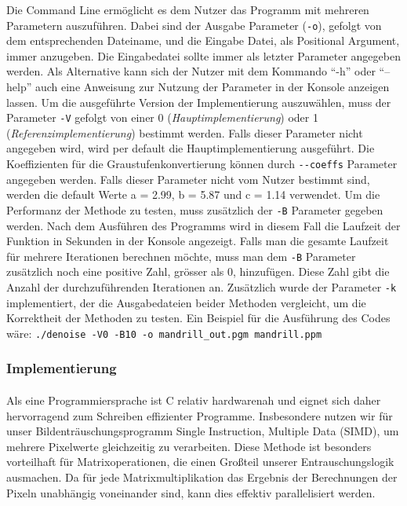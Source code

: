 \documentclass[course=erap]{aspdoc}
\begin{document}
Die Command Line ermöglicht es dem Nutzer das Programm mit mehreren Parametern auszuführen. 
Dabei sind der Ausgabe Parameter (\verb|-o|), gefolgt von dem entsprechenden Dateiname, und die Eingabe Datei, als Positional Argument, immer anzugeben. Die Eingabedatei sollte immer als letzter Parameter angegeben werden.
Als Alternative kann sich der Nutzer mit dem Kommando \enquote{-h} oder \enquote{--help} auch eine Anweisung zur
Nutzung der Parameter in der Konsole anzeigen lassen. Um die ausgeführte Version der Implementierung auszuwählen, 
muss der Parameter \verb|-V| gefolgt von einer 0 (\textit{Hauptimplementierung}) oder 1 (\textit{Referenzimplementierung}) 
bestimmt werden. Falls dieser Parameter nicht angegeben wird, wird per default die Hauptimplementierung ausgeführt. 
Die Koeffizienten für die Graustufenkonvertierung können durch \verb|--coeffs| Parameter angegeben werden. Falls dieser 
Parameter nicht vom Nutzer bestimmt sind, werden die default Werte a = 2.99, b = 5.87 und c = 1.14 verwendet. Um die 
Performanz der Methode zu testen, muss zusätzlich der \verb|-B| Parameter gegeben werden. Nach dem Ausführen des 
Programms wird in diesem Fall die Laufzeit der Funktion in Sekunden in der Konsole angezeigt. Falls man die 
gesamte Laufzeit für mehrere Iterationen berechnen möchte, muss man dem \verb|-B| Parameter zusätzlich noch eine
positive Zahl, grösser als 0, hinzufügen. Diese Zahl gibt die Anzahl der durchzuführenden Iterationen an. Zusätzlich 
wurde der Parameter \verb|-k| implementiert, der die Ausgabedateien beider Methoden vergleicht, um die Korrektheit 
der Methoden zu testen. Ein Beispiel für die Ausführung des Codes wäre: \verb|./denoise -V0 -B10 -o mandrill_out.pgm mandrill.ppm| 


\subsubsection*{Implementierung}
\paragraph{}
Als eine Programmiersprache ist C relativ hardwarenah und eignet sich daher hervorragend zum Schreiben effizienter Programme. 
Insbesondere nutzen wir für unser Bildenträuschungsprogramm Single Instruction, Multiple Data (SIMD), um mehrere Pixelwerte 
gleichzeitig zu verarbeiten. Diese Methode ist besonders vorteilhaft für Matrixoperationen, die einen Großteil unserer 
Entrauschungslogik ausmachen. Da für jede Matrixmultiplikation das Ergebnis der Berechnungen der Pixeln unabhängig voneinander sind, 
kann dies effektiv parallelisiert werden.
\end{document}
